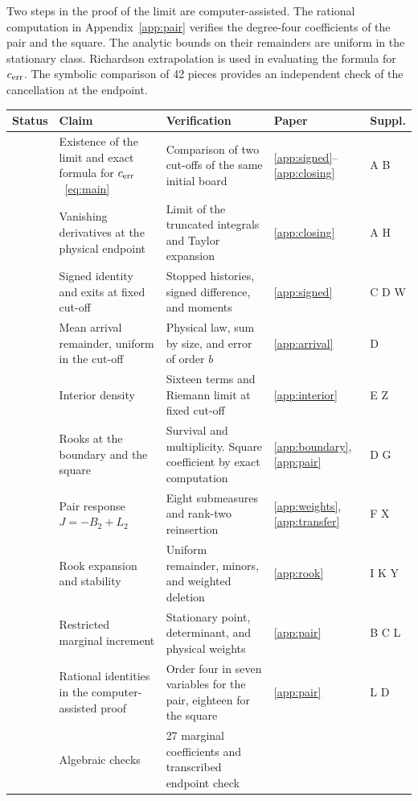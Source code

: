 Two steps in the proof of the limit are computer-assisted. The rational computation in
Appendix~\ref{app:pair} verifies the degree-four coefficients of the pair and the square. The analytic
bounds on their remainders are uniform in the stationary class. Richardson extrapolation is used in
evaluating the formula for $c_{\mathrm{err}}$. The symbolic comparison of 42 pieces provides an independent check of
the cancellation at the endpoint.
{\small
\begin{longtable}{@{}L{.09\linewidth}L{.25\linewidth}L{.33\linewidth}L{.13\linewidth}L{.08\linewidth}@{}}
\toprule
Status & Claim & Verification & Paper & Suppl.\\ \midrule
\endhead
{} & Existence of the limit and exact formula for $c_{\mathrm{err}}$~\eqref{eq:main} &
 Comparison of two cut-offs of the same initial board &
 \ref{app:signed}--\ref{app:closing} & A B \\
 & Vanishing derivatives at the physical endpoint &
 Limit of the truncated integrals and Taylor expansion &
 \ref{app:closing} & A H \\
 & Signed identity and exits at fixed cut-off &
 Stopped histories, signed difference, and moments &
 \ref{app:signed} & C D W \\
 & Mean arrival remainder, uniform in the cut-off &
 Physical law, sum by size, and error of order $b$ &
 \ref{app:arrival} & D \\
 & Interior density &
 Sixteen terms and Riemann limit at fixed cut-off &
 \ref{app:interior} & E Z \\
 & Rooks at the boundary and the square &
 Survival and multiplicity. Square coefficient by exact computation  &
 \ref{app:boundary}, \ref{app:pair} & D G \\
 & Pair response $J=-B_2+L_2$ &
 Eight submeasures and rank-two reinsertion &
 \ref{app:weights}, \ref{app:transfer} & F X \\
 & Rook expansion and stability &
 Uniform remainder, minors, and weighted deletion &
 \ref{app:rook} & I K Y \\
 & Restricted marginal increment &
 Stationary point, determinant, and physical weights &
 \ref{app:pair} & B C L \\
 & Rational identities in the computer-assisted proof &
 Order four in seven variables for the pair, eighteen for the square &
 \ref{app:pair} & L D \\
 & Algebraic checks &
 27 marginal coefficients and transcribed endpoint check &

\end{longtable}}
